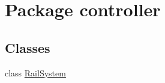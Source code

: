 \hypertarget{namespacecontroller}{}\section{Package controller}
\label{namespacecontroller}
\subsection*{Classes}
\begin{DoxyCompactItemize}
\item 
class \hyperlink{classcontroller_1_1_rail_system}{Rail\+System}
\end{DoxyCompactItemize}
